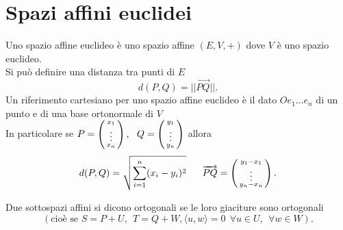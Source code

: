 \documentclass[12px]{article}
\begin{document}
\section{Spazi affini euclidei}
Uno spazio affine euclideo è uno spazio affine $(E,V, +)$ dove $V$ è uno spazio euclideo.\\
Si può definire una distanza tra punti di $E$ 
\[
 d(P,Q) = ||\overrightarrow{PQ}||
.\] 
Un riferimento cartesiano per uno spazio affine euclideo è il dato $Oe_1\ldots e_n$ di un punto e di una base ortonormale di $V$\\
In particolare se $P = \left(\begin{smallmatrix} x_1\\\vdots\\x_n\end{smallmatrix}\right), \ \ Q = \left(\begin{smallmatrix}y_1\\\vdots\\y_n\end{smallmatrix}\right)$ allora
\[
	d(P,Q) = \sqrt{\sum^n_{i=1}(x_i - y_i)^2}\ \ \ \ \ \overrightarrow{PQ} = \icol{y_1 - x_1\\ \vdots \\ y_n - x_n}
.\] 
\begin{defi}
	Due sottospazi affini si dicono ortogonali se le loro giaciture sono ortogonali 
	\[
		(\text{cioè se } S = P + U, \ \ T = Q + W, \langle u, w \rangle  = 0\ \ \forall u \in U , \ \ \forall w\in W)
	.\] 
\end{defi}
\end{document}
